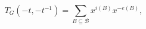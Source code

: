 \begin{equation}
T_{\mathit{G}}(-t,-t^{-1})=\sum_{B\subseteq \mathcal{B}}x^{i(B)}x^{-e(B)},
\label{39}
\end{equation}

